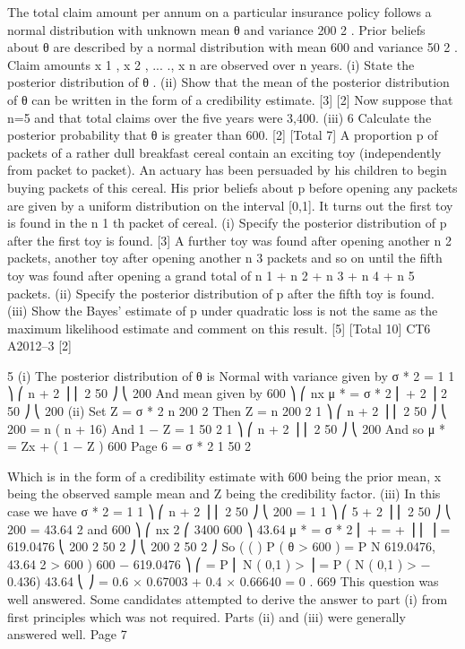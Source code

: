 \documentclass[a4paper,12pt]{article}
\begin{document}
\begin{enumerate}
The total claim amount per annum on a particular insurance policy follows a normal
distribution with unknown mean θ and variance 200 2 . Prior beliefs about θ are
described by a normal distribution with mean 600 and variance 50 2 . Claim amounts
x 1 , x 2 , ... ., x n are observed over n years.
(i) State the posterior distribution of θ .
(ii) Show that the mean of the posterior distribution of θ can be written in the
form of a credibility estimate.
[3]
[2]
Now suppose that n=5 and that total claims over the five years were 3,400.
(iii)
6
Calculate the posterior probability that θ is greater than 600.
[2]
[Total 7]
A proportion p of packets of a rather dull breakfast cereal contain an exciting toy
(independently from packet to packet). An actuary has been persuaded by his
children to begin buying packets of this cereal. His prior beliefs about p before
opening any packets are given by a uniform distribution on the interval [0,1]. It turns
out the first toy is found in the n 1 th packet of cereal.
(i)
Specify the posterior distribution of p after the first toy is found.
[3]
A further toy was found after opening another n 2 packets, another toy after opening
another n 3 packets and so on until the fifth toy was found after opening a grand total
of n 1 + n 2 + n 3 + n 4 + n 5 packets.
(ii) Specify the posterior distribution of p after the fifth toy is found.
(iii) Show the Bayes’ estimate of p under quadratic loss is not the same as the
maximum likelihood estimate and comment on this result.
[5]
[Total 10]
CT6 A2012–3
[2]



5
(i)
The posterior distribution of θ is Normal with variance given by
σ * 2 =
1
1 ⎞
⎛ n
+ 2 ⎟
⎜
2
50 ⎠
⎝ 200
And mean given by
600 ⎞
⎛ nx
μ * = σ * 2 ⎜
+ 2 ⎟
2
50 ⎠
⎝ 200
(ii)
Set
Z = σ * 2
n
200 2
Then
Z =
n
200 2
1 ⎞
⎛ n
+ 2 ⎟
⎜
2
50 ⎠
⎝ 200
=
n
( n + 16)
And
1 − Z =
1
50 2
1 ⎞
⎛ n
+ 2 ⎟
⎜
2
50 ⎠
⎝ 200
And so
μ * = Zx + ( 1 − Z ) 600
Page 6
= σ * 2
1
50 2

Which is in the form of a credibility estimate with 600 being the prior mean,
x being the observed sample mean and Z being the credibility factor.
(iii)
In this case we have
σ * 2 =
1
1 ⎞
⎛ n
+ 2 ⎟
⎜
2
50 ⎠
⎝ 200
=
1
1 ⎞
⎛ 5
+ 2 ⎟
⎜
2
50 ⎠
⎝ 200
= 43.64 2
and
600 ⎞
⎛ nx
2 ⎛ 3400 600 ⎞
43.64
μ * = σ * 2 ⎜
+
=
+
⎟
⎜
⎟ = 619.0476
⎝ 200 2 50 2 ⎠
⎝ 200 2 50 2 ⎠
So
( (
)
P ( θ > 600 ) = P N 619.0476, 43.64 2 > 600
)
600 − 619.0476 ⎞
⎛
= P ⎜ N ( 0,1 ) >
⎟ = P ( N ( 0,1 ) > − 0.436)
43.64
⎝
⎠
= 0.6 × 0.67003 + 0.4 × 0.66640
= 0 . 669
This question was well answered. Some candidates attempted to derive the answer to part (i)
from first principles which was not required. Parts (ii) and (iii) were generally answered
well.
Page 7


\end{enumerate}
\end{document}

